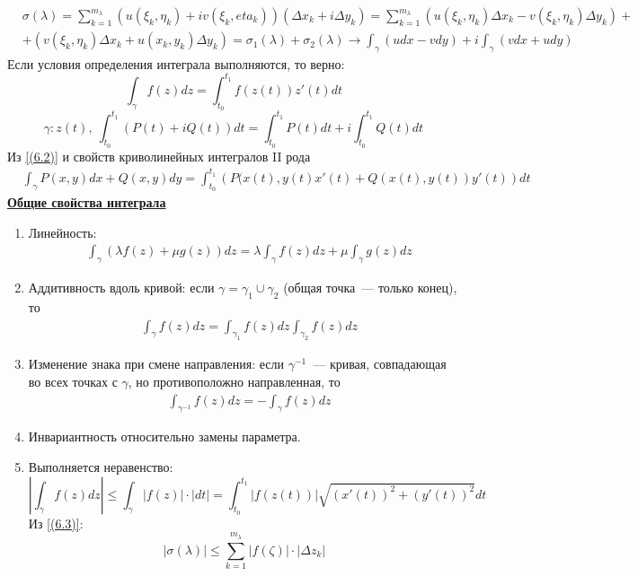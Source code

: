 \pr
\begin{align*}
  & \sigma(\lambda) = \sum_{k = 1}^{m_\lambda}\left( u(\xi_k, \eta_k) + iv(\xi_k, eta_k) \right)\left( \Delta x_k + i \Delta y_k \right) = \sum_{k = 1}^{m_\lambda}\left( u(\xi_k, \eta_k) \Delta x_k - v(\xi_k, \eta_k) \Delta y_k\right) + \\
  & + \left( v(\xi_k, \eta_k) \Delta x_k + u(x_k, y_k) \Delta y_k\right) = \sigma_1(\lambda) + \sigma_2(\lambda) \to \int_{\gamma}\left( u dx - v dy \right) + i \int_\gamma \left( v dx + u dy \right)
\end{align*}
\corollary
Если условия определения интеграла выполняются, то верно:
\begin{equation} \label{(6.3)}
    \int_\gamma f(z) dz = \int_{t_0}^{t_1}f(z(t))z'(t)dt
\end{equation}
\begin{equation} \label{(6.4)}
    \gamma: z(t), \ \int_{t_0}^{t_1}\left( P(t) + iQ(t) \right) dt = \int_{t_0}^{t_1}P(t)dt + i \int_{t_0}^{t_1}Q(t)dt
\end{equation}
\pr
Из \eqref{(6.2)} и свойств криволинейных интегралов II рода
\begin{align*}
  &\int_{\gamma}P(x,y) dx + Q(x,y)dy = \int_{t_0}^{t_1} \left( P(x(t), y(t)x'(t) + Q(x(t), y(t))y'(t) \right) dt
\end{align*}
\underline{\textbf{Общие свойства интеграла}}
\begin{enumerate}
    \item Линейность:
    \begin{align*}
      &\int_{\gamma}\left(\lambda f(z) + \mu g(z)\right) dz = \lambda\int_{\gamma}f(z) dz + \mu \int_\gamma g(z) dz
    \end{align*}
    \item Аддитивность вдоль кривой: если $\gamma = \gamma_1 \cup \gamma_2$
    (общая точка~--- только конец), то
    \begin{align*}
      &\int_{\gamma}f(z) dz = \int_{\gamma_1}f(z) dz \int_{\gamma_2} f(z) dz
    \end{align*}
    \item Изменение знака при смене направления: если $\gamma^{-1}$~---
    кривая, совпадающая во всех точках с $\gamma$, но противоположно
    направленная, то
    \begin{align*}
      &\int_{\gamma^{-1}}f(z) dz = - \int_{\gamma}f(z) dz
    \end{align*}
    \item Инвариантность относительно замены параметра.
    \item Выполняется неравенство:
    \begin{equation} \label{(6.5)}
        \left| \int_\gamma f(z) dz \right| \leq \int_{\gamma}\left| f(z) \right| \cdot \left| dt \right| = \int_{t_0}^{t_1} \left| f(z(t)) \right| \sqrt{(x'(t))^2 + (y'(t))^2}dt
    \end{equation}
    \pr
    Из \eqref{(6.3)}:
    \begin{equation} \label{(6.6)}
        \left| \sigma(\lambda) \right| \leq \sum_{k = 1}^{m_\lambda}\left| f(\zeta) \right| \cdot \left| \Delta z_k \right|
    \end{equation}
\end{enumerate}

